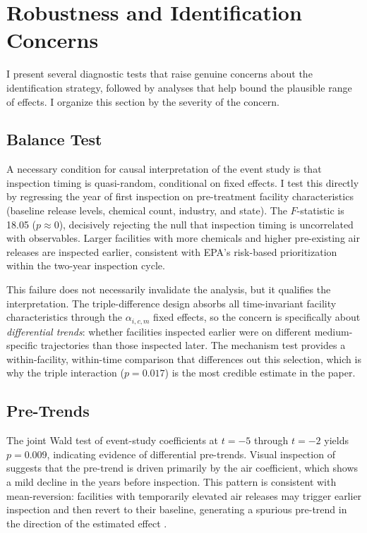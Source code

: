 \documentclass[12pt]{article}
\begin{document}
\section{Robustness and Identification Concerns}
\label{sec:robustness}

I present several diagnostic tests that raise genuine concerns about the identification strategy, followed by analyses that help bound the plausible range of effects. I organize this section by the severity of the concern.

\subsection{Balance Test}

A necessary condition for causal interpretation of the event study is that inspection timing is quasi-random, conditional on fixed effects. I test this directly by regressing the year of first inspection on pre-treatment facility characteristics (baseline release levels, chemical count, industry, and state). The $F$-statistic is 18.05 ($p \approx 0$), decisively rejecting the null that inspection timing is uncorrelated with observables. Larger facilities with more chemicals and higher pre-existing air releases are inspected earlier, consistent with EPA's risk-based prioritization within the two-year inspection cycle.

This failure does not necessarily invalidate the analysis, but it qualifies the interpretation. The triple-difference design absorbs all time-invariant facility characteristics through the $\alpha_{i,c,m}$ fixed effects, so the concern is specifically about \textit{differential trends}: whether facilities inspected earlier were on different medium-specific trajectories than those inspected later. The mechanism test provides a within-facility, within-time comparison that differences out this selection, which is why the triple interaction ($p = 0.017$) is the most credible estimate in the paper.

\subsection{Pre-Trends}

The joint Wald test of event-study coefficients at $t = -5$ through $t = -2$ yields $p = 0.009$, indicating evidence of differential pre-trends. Visual inspection of  suggests that the pre-trend is driven primarily by the air coefficient, which shows a mild decline in the years before inspection. This pattern is consistent with mean-reversion: facilities with temporarily elevated air releases may trigger earlier inspection and then revert to their baseline, generating a spurious pre-trend in the direction of the estimated effect \citep{dechaisemartin2020, sunab2021}.
\end{document}
